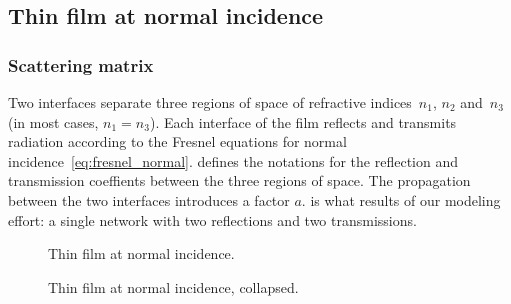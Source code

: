 \clearpage
\subsection{Thin film at normal incidence}
\label{sec:thin_film_at_normal_incidence}


\subsubsection{Scattering matrix}

Two interfaces separate three regions of space of refractive indices~$n_1$, $n_2$ and~$n_3$ (in most cases, $n_1=n_3$).
Each interface of the film reflects and transmits radiation according to the Fresnel equations for normal incidence~\eqref{eq:fresnel_normal}.
 defines the notations for the reflection and transmission coeffients between the three regions of space.
The propagation between the two interfaces introduces a factor $a$.
 is what results of our modeling effort: a single network with two reflections and two transmissions.
\begin{figure}[hbtp]
    \centering
    
    \caption{Thin film at normal incidence.}
    \label{fig:thin_film_normal}
\end{figure}
\begin{figure}[hbtp]
    \centering
    
    \caption{Thin film at normal incidence, collapsed.}
    \label{fig:thin_film_normal_collapsed}
\end{figure}

